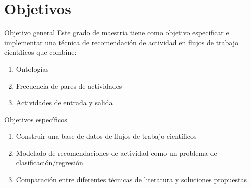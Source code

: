 \section{Objetivos}
	\begin{frame}
		\begin{block}{Objetivo general}
			Este grado de maestria tiene como objetivo especificar e implementar una técnica de recomendación de actividad en flujos de trabajo científicos que combine: 
				\begin{enumerate}
					\item Ontologías
					\item Frecuencia de pares de actividades
					\item Actividades de entrada y salida
				\end{enumerate}
		\end{block}
	\end{frame}

\begin{frame}
	\begin{block}{Objetivos específicos}
		\begin{enumerate}
			\item Construir una base de datos de flujos de trabajo científicos
			\item Modelado de recomendaciones de actividad como un problema de clasificación/regresión
			\item Comparación entre diferentes técnicas de literatura y soluciones propuestas
		\end{enumerate}
	\end{block}
\end{frame}
